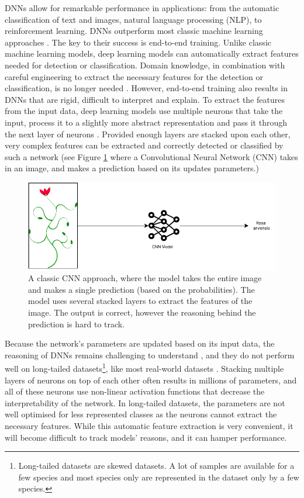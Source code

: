\documentclass[a4paper, 12pt, oneside]{book} %
\begin{document}
DNNs allow for remarkable performance in applications: from the automatic classification of text and images, natural language processing (NLP), to reinforcement learning.
DNNs outperform most classic machine learning approaches \autocite{he_delving_2015, brown_language_2020}.
The key to their success is end-to-end training.
Unlike classic machine learning models, deep learning models can automatically extract features needed for detection or classification.
Domain knowledge, in combination with careful engineering to extract the necessary features for the detection or classification, is no longer needed \autocite{lecun_deep_2015}.
However, end-to-end training also results in DNNs that are rigid, difficult to interpret and explain.
To extract the features from the input data, deep learning models use multiple neurons that take the input, process it to a slightly more abstract representation and pass it through the next layer of neurons \autocite{schmidhuber_deep_2015}.
Provided enough layers are stacked upon each other, very complex features can be extracted and correctly detected or classified by such a network (see Figure \ref{fig:CNN} where a Convolutional Neural Network (CNN) takes in an image, and makes a prediction based on its updates parameters.)
\begin{figure} [tbp]
    \centering
    \vspace{0cm}
    \includegraphics[width=\textwidth]{figures/CNN.pdf}
    \caption[Classic CNN]{A classic CNN approach, where the model takes the entire image and makes a single prediction (based on the probabilities). The model uses several stacked layers to extract the features of the image. The output is correct, however the reasoning behind the prediction is hard to track.}
    \label{fig:CNN}
\end{figure}

Because the network's parameters are updated based on its input data, the reasoning of DNNs remains challenging to understand \autocite{li_interpretable_2021, losch_interpretability_2019}, and they do not perform well on long-tailed datasets\footnote{Long-tailed datasets are skewed datasets. A lot of samples are available for a few species and most species only are represented in the dataset only by a few species.}, like most real-world datasets \autocite{van_horn_inaturalist_2018}.
Stacking multiple layers of neurons on top of each other often results in millions of parameters, and all of these neurons use non-linear activation functions that decrease the interpretability of the network.
In long-tailed datasets, the parameters are not well optimised for less represented classes as the neurons cannot extract the necessary features.
While this automatic feature extraction is very convenient, it will become difficult to track models' reasons, and it can hamper performance.
\end{document}
